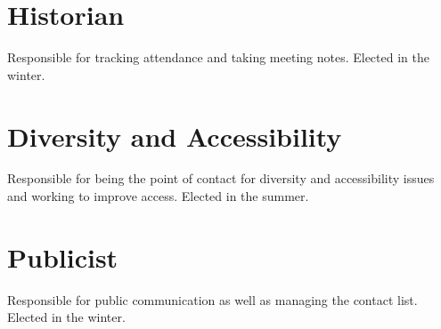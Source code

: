 \section{Historian}\label{sec:historian}
Responsible for tracking attendance and taking meeting notes. Elected in the winter.

\section{Diversity and Accessibility}\label{sec:accessability}
Responsible for being the point of contact for diversity and accessibility issues and working to improve access. Elected in the summer.

\section{Publicist}\label{sec:publicist}
Responsible for public communication as well as managing the contact list. Elected in the winter.

